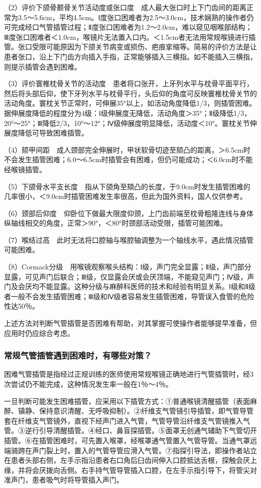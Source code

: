 （2）评价下颌骨颞骨关节活动度或张口度　成人最大张口时上下门齿间的距离正常为3.5～5.6cm，平均4.5cm。Ⅰ度张口困难者为2.5～3.0cm，技术娴熟的操作者仍可完成经口气管插管过程；Ⅱ度张口困难者为1.2～2.0cm，难以窥见咽喉部结构；Ⅲ度张口困难者＜1.0cm，喉镜片无法置入口内。＜1.5cm者无法用常规喉镜进行插管。张口受限可能原因为下颌关节病变或损伤、疤痕挛缩等。简易的评价方法是让患者张口，沿上下门齿方向插入手指，正常能够插入三横指。如不能插入三横指，则提示插管会遇到困难。

（3）评价寰椎枕骨关节的活动度　患者将口张开，上牙列水平与枕骨平面平行，然后将头部后仰，使下牙列水平与枕骨平行，头后仰的角度可反映寰椎枕骨关节的活动角度。寰枕关节正常时，可伸展35°以上，如活动角度降低1/3，则插管困难。据伸展度降低的程度分为4级：Ⅰ级伸展度无降低，活动角度＞35°；Ⅱ级降低1/3，20°～25°；Ⅲ降低2/3，10°～12°；Ⅳ级伸展度明显降低，活动度＜10°。寰枕关节伸展度降低可导致困难插管。

（4）颏甲间距　成人颈部完全伸展时，甲状软骨切迹至颏凸的距离，＞6.5cm时不会发生插管困难；6.0～6.5cm时插管会有困难，但仍可能成功；＜6.0cm时不能经喉镜插管。

（5）下颌骨水平支长度　指从下颌角至頦凸的长度，于9.0cm时发生插管困难的几率很小，＜9.0cm时插管困难发生率很高，但此为国外资料，国人仅供参考。

（6）颈部后仰度　仰卧位下做最大限度仰颈，上门齿前端至枕骨粗隆连线与身体纵轴线相交的角度，正常＞90°，＜80°时颈部活动受限，插管可能困难。

（7）喉结过高　此时无法将口腔轴与喉腔轴调整为一个轴线水平，遇此情况插管可能困难。

（8）Cormack分级　用喉镜观察喉头结构：Ⅰ级，声门完全显露；Ⅱ级，声门部分显露，可见声门后联合；Ⅲ级，仅显露会厌或会厌顶端，不能窥见声门；Ⅳ级，声门及会厌均不能显露。这种分级与麻醉科医师的技术和经验有明显关系。Ⅰ级和Ⅱ级者一般不会发生插管困难；Ⅲ级和Ⅳ级者容易发生插管困难，导管误入食管的危险性达50％。

上述方法对判断气管插管是否困难有帮助，对其掌握可使操作者能够提早准备，但应用时仍应综合考虑。

\subsubsection{常规气管插管遇到困难时，有哪些对策？}

困难气管插管是指经过正规训练的医师使用常规喉镜正确地进行气管插管时，经3次尝试仍不能完成，这种情况发生率一般在1％～4％。

一旦判断可能发生困难插管，应采用以下插管方式：①普通喉镜清醒插管（表面麻醉、镇静、保持意识清醒、无呼吸抑制）。②纤维支气管镜引导插管，即气管导管套在纤维支气管镜外，直视下经声门进入气管，气管导管沿纤维支气管镜推入气管。③逆行引导清醒插管。④经口、鼻盲探插管。⑤面罩无创通气辅助下气管切开插管。⑥在插管困难时，可先置入喉罩，经喉罩通气管置入气管导管。当通气罩远端骑跨在声门裂上时，置入的气管导管应滑入气管。⑦指探引导法，即操作者站立在患者头部右侧，左手示指沿患者右口角后臼齿间伸入口腔抵达舌根，探触会厌上缘，并将会厌拨向舌侧。右手持气管导管插入口腔，在左手示指引导下，将管尖对准声门，患者吸气时将导管插入声门。

